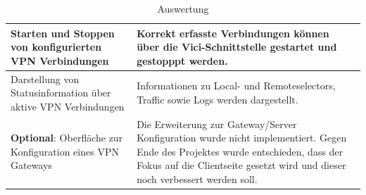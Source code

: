 \begin{table}[H]
\begin{tabular}{|p{}|p{}|}
    Starten und Stoppen von konfigurierten VPN Verbindungen & Korrekt erfasste Verbindungen können über die Vici-Schnittstelle gestartet und gestopppt werden. \\ \hline
    Darstellung von Statusinformation über aktive VPN Verbindungen & Informationen zu Local- und Remoteselectors, Traffic sowie Logs werden dargestellt. \\ \hline
    \textbf{Optional}: Oberfläche zur Konfiguration eines VPN Gateways & Die Erweiterung zur Gateway/Server Konfiguration wurde nicht implementiert. Gegen Ende des Projektes wurde entschieden, dass der Fokus auf die Clientseite gesetzt wird und dieser noch verbessert werden soll.   \\ \hline 
    \end{tabular}
    \caption[Auswertung]{Auswertung}
\end{table}
\medskip \medskip